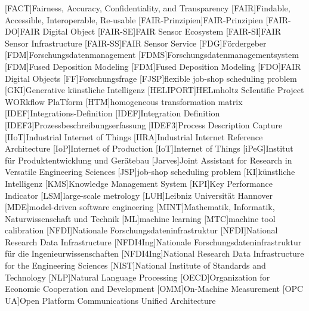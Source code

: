 \begin{acronym}[Abbreviations]
    [FACT]{Fairness, Accuracy, Confidentiality, and Transparency}
    [FAIR]{Findable, Accessible, Interoperable, Re-usable}
    [FAIR-Prinzipien]{FAIR-Prinzipien}
    [FAIR-DO]{FAIR Digital Object}
    [FAIR-SE]{FAIR Sensor Ecosystem}
    [FAIR-SI]{FAIR Sensor Infrastructure}
    [FAIR-SS]{FAIR Sensor Service}
	[FDG]{Fördergeber}
	[FDM]{Forschungsdatenmanagement}
	[FDMS]{Forschungsdatenmanagementsystem}
	[FDM]{Fused Deposition Modeling}
    [FDM]{Fused Deposition Modeling}
	[FDO]{FAIR Digital Objects}
	[FF]{Forschungsfrage}
    [FJSP]{flexible job-shop scheduling problem}
	[GKI]{Generative künstliche Intelligenz}
    [HELIPORT]{HELmholtz ScIentific Project WORkflow PlaTform}
    [HTM]{homogeneous transformation matrix}
	[IDEF]{Integrations-Definition}
	[IDEF]{Integration Definition}
	[IDEF3]{Prozessbeschreibungserfassung}
	[IDEF3]{Process Description Capture}
    [IIoT]{Industrial Internet of Things}
    [IIRA]{Industrial Internet Reference Architecture}
    [IoP]{Internet of Production}
    [IoT]{Internet of Things}
	[iPeG]{Institut für Produktentwicklung und Gerätebau}
    [Jarves]{Joint Assistant for Research in Versatile Engineering Sciences}
    [JSP]{job-shop scheduling problem}
	[KI]{künstliche Intelligenz}
    [KMS]{Knowledge Management System}
	[KPI]{Key Performance Indicator}
    [LSM]{large-scale metrology}
	[LUH]{Leibniz Universität Hannover}
    [MDE]{model-driven software engineering}
    [MINT]{Mathematik, Informatik, Naturwissenschaft und Technik}
    [ML]{machine learning}
    [MTC]{machine tool calibration}
	[NFDI]{Nationale Forschungsdateninfrastruktur}
	[NFDI]{National Research Data Infrastructure}
	[NFDI4Ing]{Nationale Forschungsdateninfrastruktur für die \mbox{Ingenieurwissenschaften}}
	[NFDI4Ing]{National Research Data Infrastructure for the Engineering Sciences}
    [NIST]{National Institute of Standards and Technology}
	[NLP]{Natural Language Processing}
    [OECD]{Organization for Economic Cooperation and Development}
    [OMM]{On-Machine Measurement}
    [OPC UA]{Open Platform Communications Unified Architecture}

\end{acronym}
